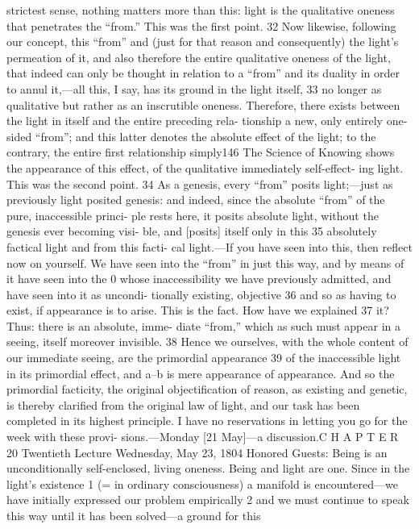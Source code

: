 strictest sense, nothing matters more than this: light is the qualitative oneness
that penetrates the “from.” This was the first point. 32
Now likewise, following our concept, this “from” and (just for that reason
and consequently) the light’s permeation of it, and also therefore the entire
qualitative oneness of the light, that indeed can only be thought in relation to
a “from” and its duality in order to annul it,—all this, I say, has its ground in
the light itself, 33 no longer as qualitative but rather as an inscrutible oneness.
Therefore, there exists between the light in itself and the entire preceding rela-
tionship a new, only entirely one-sided “from”; and this latter denotes the
absolute effect of the light; to the contrary, the entire first relationship simply146
The Science of Knowing
shows the appearance of this effect, of the qualitative immediately self-effect-
ing light. This was the second point. 34
As a genesis, every “from” posits light;—just as previously light posited
genesis: and indeed, since the absolute “from” of the pure, inaccessible princi-
ple rests here, it posits absolute light, without the genesis ever becoming visi-
ble, and [posits] itself only in this 35 absolutely factical light and from this facti-
cal light.—If you have seen into this, then reflect now on yourself. We have seen
into the “from” in just this way, and by means of it have seen into the 0 whose
inaccessibility we have previously admitted, and have seen into it as uncondi-
tionally existing, objective 36 and so as having to exist, if appearance is to arise.
This is the fact. How have we explained 37 it? Thus: there is an absolute, imme-
diate “from,” which as such must appear in a seeing, itself moreover invisible. 38
Hence we ourselves, with the whole content of our immediate seeing, are the
primordial appearance 39 of the inaccessible light in its primordial effect, and a–b
is mere appearance of appearance. And so the primordial facticity, the original
objectification of reason, as existing and genetic, is thereby clarified from the
original law of light, and our task has been completed in its highest principle.
I have no reservations in letting you go for the week with these provi-
sions.—Monday [21 May]—a discussion.C H A P T E R
20
Twentieth Lecture
Wednesday, May 23, 1804
Honored Guests:
Being is an unconditionally self-enclosed, living oneness. Being and light are
one. Since in the light’s existence 1 (= in ordinary consciousness) a manifold is
encountered—we have initially expressed our problem empirically 2 and we
must continue to speak this way until it has been solved—a ground for this
